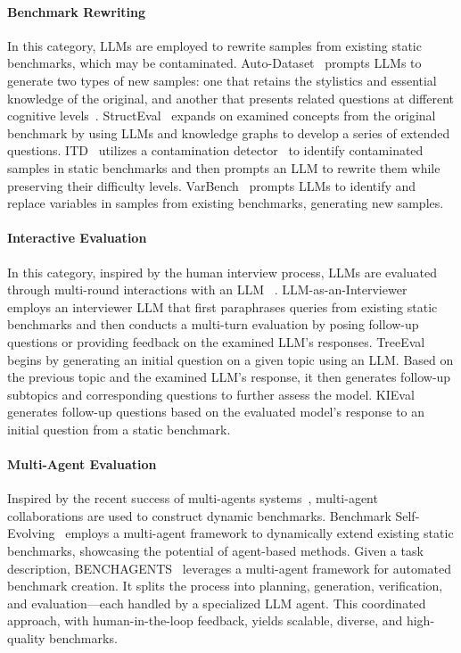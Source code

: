 \paragraph{Benchmark Rewriting}
In this category, LLMs are employed to rewrite samples from existing static benchmarks, which may be contaminated.
Auto-Dataset~\citep{ying2024automating} prompts LLMs to generate two types of new samples: one that retains the stylistics and essential knowledge of the original, and another that presents related questions at different cognitive levels~\citep{bloom1956handbook}.
StructEval~\citep{cao-etal-2024-structeval} expands on examined concepts from the original benchmark by using LLMs and knowledge graphs to develop a series of extended questions.
ITD~\citep{zhu-etal-2024-inference} utilizes a contamination detector~\citep{shidetecting} to identify contaminated samples in static benchmarks and then prompts an LLM to rewrite them while preserving their difficulty levels.
VarBench~\citep{qian2024varbench} prompts LLMs to identify and replace variables in samples from existing benchmarks, generating new samples.


\paragraph{Interactive Evaluation} 
In this category, inspired by the human interview process, LLMs are evaluated through multi-round interactions with an LLM ~\citep{li2023beyond}.
LLM-as-an-Interviewer~\citep{kim2024llm} employs an interviewer LLM that first paraphrases queries from existing static benchmarks and then conducts a multi-turn evaluation by posing follow-up questions or providing feedback on the examined LLM's responses.
TreeEval~\citep{li2024treeeval} begins by generating an initial question on a given topic using an LLM. Based on the previous topic and the examined LLM’s response, it then generates follow-up subtopics and corresponding questions to further assess the model.
KIEval~\citep{yu-etal-2024-kieval} generates follow-up questions based on the evaluated model's response to an initial question from a static benchmark.

\paragraph{Multi-Agent Evaluation} 
Inspired by the recent success of multi-agents systems~\citep{guo2024large}, multi-agent collaborations are used to construct dynamic benchmarks.
Benchmark Self-Evolving~\citep{wang2024selfevolving} employs a multi-agent framework to dynamically extend existing static benchmarks, showcasing the potential of agent-based methods.
Given a task description, BENCHAGENTS~\citep{butt2024benchagents} leverages a multi-agent framework for automated benchmark creation. 
It splits the process into planning, generation, verification, and evaluation—each handled by a specialized LLM agent.
This coordinated approach, with human-in-the-loop feedback, yields scalable, diverse, and high-quality benchmarks. 




